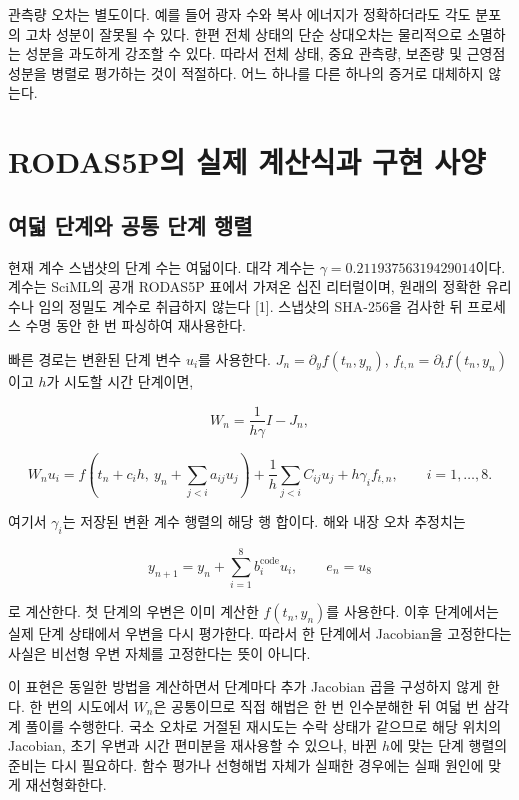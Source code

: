 \documentclass[
  10pt,
  a4paper,
]{article}
\begin{document}
관측량 오차는 별도이다. 예를 들어 광자 수와 복사 에너지가 정확하더라도
각도 분포의 고차 성분이 잘못될 수 있다. 한편 전체 상태의 단순 상대오차는
물리적으로 소멸하는 성분을 과도하게 강조할 수 있다. 따라서 전체 상태,
중요 관측량, 보존량 및 근영점 성분을 병렬로 평가하는 것이 적절하다. 어느
하나를 다른 하나의 증거로 대체하지 않는다.

\hypertarget{rodas5puxc758-uxc2e4uxc81c-uxacc4uxc0b0uxc2dduxacfc-uxad6cuxd604-uxc0acuxc591}{%
\section{RODAS5P의 실제 계산식과 구현
사양}\label{rodas5puxc758-uxc2e4uxc81c-uxacc4uxc0b0uxc2dduxacfc-uxad6cuxd604-uxc0acuxc591}}

\hypertarget{uxc5ecuxb35f-uxb2e8uxacc4uxc640-uxacf5uxd1b5-uxb2e8uxacc4-uxd589uxb82c}{%
\subsection{여덟 단계와 공통 단계
행렬}\label{uxc5ecuxb35f-uxb2e8uxacc4uxc640-uxacf5uxd1b5-uxb2e8uxacc4-uxd589uxb82c}}

현재 계수 스냅샷의 단계 수는 여덟이다. 대각 계수는
\(\gamma=0.21193756319429014\)이다. 계수는 SciML의 공개 RODAS5P 표에서
가져온 십진 리터럴이며, 원래의 정확한 유리수나 임의 정밀도 계수로
취급하지 않는다 {[}1{]}. 스냅샷의 SHA-256을 검사한 뒤 프로세스 수명 동안
한 번 파싱하여 재사용한다.

빠른 경로는 변환된 단계 변수 \(u_i\)를 사용한다.
\(J_n=\partial_y f(t_n,y_n)\), \(f_{t,n}=\partial_t f(t_n,y_n)\)이고
\(h\)가 시도할 시간 단계이면,

\[
W_n=\frac{1}{h\gamma}I-J_n,
\]

\[
W_nu_i=f\!\left(t_n+c_ih,\ y_n+\sum_{j<i}a_{ij}u_j\right)
 +\frac1h\sum_{j<i}C_{ij}u_j+h\gamma_i f_{t,n},
\qquad i=1,\ldots,8.
\]

여기서 \(\gamma_i\)는 저장된 변환 계수 행렬의 해당 행 합이다. 해와 내장
오차 추정치는

\[
y_{n+1}=y_n+\sum_{i=1}^8b_i^{\mathrm{code}}u_i,
\qquad e_n=u_8
\]

로 계산한다. 첫 단계의 우변은 이미 계산한 \(f(t_n,y_n)\)를 사용한다.
이후 단계에서는 실제 단계 상태에서 우변을 다시 평가한다. 따라서 한
단계에서 Jacobian을 고정한다는 사실은 비선형 우변 자체를 고정한다는 뜻이
아니다.

이 표현은 동일한 방법을 계산하면서 단계마다 추가 Jacobian 곱을 구성하지
않게 한다. 한 번의 시도에서 \(W_n\)은 공통이므로 직접 해법은 한 번
인수분해한 뒤 여덟 번 삼각계 풀이를 수행한다. 국소 오차로 거절된
재시도는 수락 상태가 같으므로 해당 위치의 Jacobian, 초기 우변과 시간
편미분을 재사용할 수 있으나, 바뀐 \(h\)에 맞는 단계 행렬의 준비는 다시
필요하다. 함수 평가나 선형해법 자체가 실패한 경우에는 실패 원인에 맞게
재선형화한다.
\end{document}
